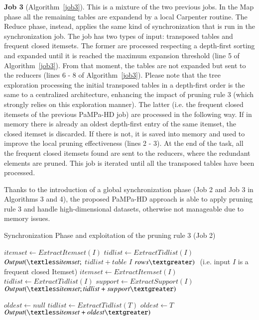 \textbf{Job 3} (Algorithm~\ref{job3}). This is a mixture of the two previous
jobs. In the Map phase all the remaining tables
are expandend by a local Carpenter routine. The Reduce phase, instead, applies
the same kind of synchronization that is run in the synchronization job. The job
has two types of input: transposed tables and frequent closed itemsets. The
former are processed respecting a depth-first sorting and expanded until it is
reached the maximum expansion threshold (line 5 of Algorithm~\ref{job3}). From that moment, the tables are not
expanded but sent to the reducers (lines 6 - 8 of Algorithm~\ref{job3}). Please note that the tree exploration
processing the initial transposed tables in a depth-first order is the same
to a centralized architecture, enhancing the impact of pruning rule 3 (which strongly relies on this exploration manner).
The latter (i.e. the frequent closed itemsets of the previous PaMPa-HD job) are
processed in the following way. If in memory there is already an oldest
depth-first entry of the same itemset, the closed itemset is discarded. If there
is not, it is saved into memory  and used to improve the local pruning
effectiveness (lines 2 - 3). At the end of the task, all the frequent closed itemsets found are sent to
the reducers, where the redundant elements are pruned.
This job is iterated until all the transposed tables have been processed.





Thanks to the introduction of a global synchronization phase (Job 2 and
Job 3 in Algorithms 3 and 4),
the proposed PaMPa-HD approach is able to apply pruning rule 3
and handle high-dimensional datasets,
otherwise not manageable due to memory issues.



\begin{algorithm}[H]
\centering
\scriptsize
\caption{Synchronization Phase and exploitation of the pruning rule 3 (Job 2)}
  \label{job2}
 \begin{algorithmic}[1]
\State $itemset\gets ExtractItemset(I)$
\State $tidlist\gets ExtractTidlist(I)$
\State $Output(  \textless itemset;$ $tidlist+table$ $I$ $rows  \textgreater) $
\Else $ $  (i.e. input $I$ is a frequent closed Itemset)
\State $itemset\gets ExtractItemset(I)$
\State $tidlist\gets ExtractTidlist(I)$
\State $support\gets ExtractSupport(I)$
\State $Output(  \textless itemset;tidlist+support \textgreater) $
\EndIf

\EndProcedure
{}
\State $oldest\gets null$
\State $tidlist\gets ExtractTidlist(T)$
 \State $oldest\gets T$
\EndIf
\EndFor
\State $Output(\textless itemset+oldest\textgreater )$
 \EndProcedure
 \end{algorithmic}
\end{algorithm}

